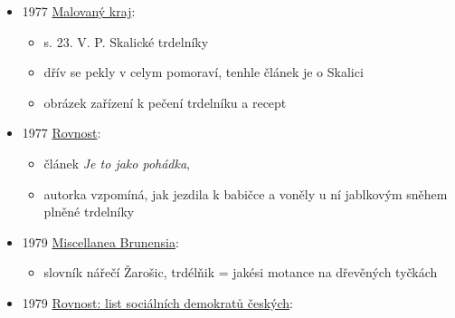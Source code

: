 \begin{itemize}
  \begin{itemize}
  \tightlist
  \item
    25.09.1976, 91(229), s. 3:

    \begin{itemize}
    \tightlist
    \item
      \emph{O hodech vůbec a o těch brněnských},
    \item
       a hodový máj, nabízely se komínské koláče a
      smažené trdelníky
    \end{itemize}
  \end{itemize}
\item
  1977
  \href{https://ndk.cz/uuid/uuid:84ffac90-ec3f-11e3-97c9-001018b5eb5c}{Malovaný
  kraj}:

  \begin{itemize}
  \tightlist
  \item
    s. 23. V. P. Skalické trdelníky
  \item
    dřív se pekly v celym pomoraví, tenhle článek je o Skalici
  \item
    obrázek zařízení k pečení trdelníku a recept
  \end{itemize}
\item
  1977
  \href{https://ceskadigitalniknihovna.cz/uuid/uuid:287f33fd-b113-44e3-b64c-9c82f3afa022}{Rovnost}:

  \begin{itemize}
  \tightlist
  \item
    článek \emph{Je to jako pohádka},
  \item
    autorka vzpomíná, jak jezdila k babičce a voněly u ní jablkovým
    sněhem plněné trdelníky
  \end{itemize}
\item
  1979
  \href{https://ceskadigitalniknihovna.cz/view/uuid:be7361f0-4ec5-11ed-8291-5ef3fc9bb22f?page=uuid\%3A7ae36698-432f-4b36-b735-c85727b4d482&source=nkp}{Miscellanea
  Brunensia}:

  \begin{itemize}
  \tightlist
  \item
    slovník nářečí Žarošic, trdélňik = jakési motance na dřevěných
    tyčkách
  \end{itemize}
\item
  1979
  \href{https://ceskadigitalniknihovna.cz/uuid/uuid:15aadd4e-cf35-4c33-afac-de13c4594761}{Rovnost:
  list sociálních demokratů českých}:


\end{itemize}
